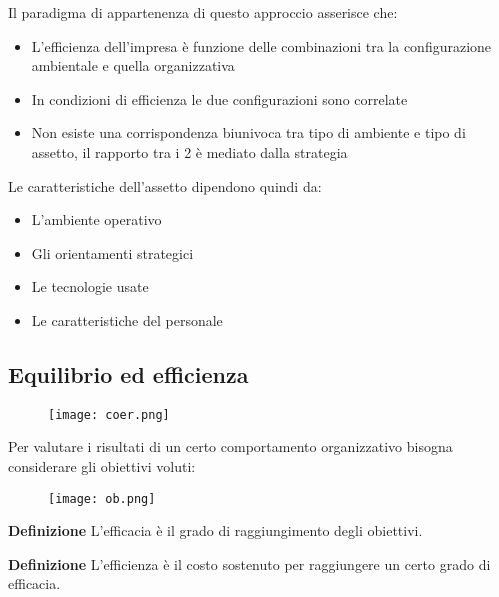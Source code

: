 \documentclass{article}
\newcommand{\df}{\noindent\textbf{Definizione }}
\begin{document}
\vspace{5pt}

\noindent Il paradigma di appartenenza di questo approccio asserisce che:
\begin{itemize}
    \item L'efficienza dell'impresa è funzione delle combinazioni tra la configurazione ambientale e quella organizzativa
    \item In condizioni di efficienza le due configurazioni sono correlate
    \item Non esiste una corrispondenza biunivoca tra tipo di ambiente e tipo di assetto, il rapporto tra i 2 è mediato dalla strategia\newline
\end{itemize}

\noindent Le caratteristiche dell'assetto dipendono quindi da:
\begin{itemize}
    \item L'ambiente operativo
    \item Gli orientamenti strategici
    \item Le tecnologie usate
    \item Le caratteristiche del personale
\end{itemize}

\newpage

\subsection{Equilibrio ed efficienza}

\begin{figure}[ht]
    \centering
    \texttt{[image: coer.png]}
\end{figure}

\vspace{4pt}

\noindent Per valutare i risultati di un certo comportamento organizzativo bisogna considerare gli obiettivi voluti:

\begin{figure}[ht]
    \centering
    \texttt{[image: ob.png]}
\end{figure}

\df L'efficacia è il grado di raggiungimento degli obiettivi.\newline

\df L'efficienza è il costo sostenuto per raggiungere un certo grado di efficacia.\newline
\end{document}
